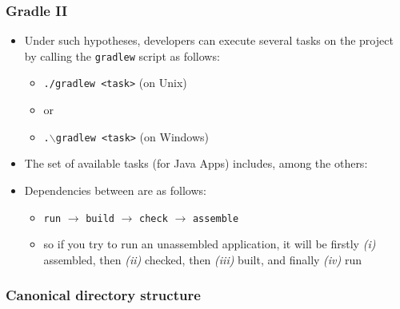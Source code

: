 \documentclass[handout]{beamer}\mode<presentation>{\usetheme{AMSCesenaBleu}}
\begin{document}
\begin{frame}
\frametitle{Gradle II}
    \begin{itemize}
        \item<1-8> Under such hypotheses, developers can execute several tasks on the project by calling the \texttt{gradlew} script as follows:
        \begin{itemize}
            \item<1-8>[\$] \texttt{\alert{./}gradlew \alert{<task>}} \quad (on Unix)
            \item<1-8>[] or
            \item<1-8>[$>$] \texttt{\alert{.$\backslash$}gradlew \alert{<task>}} \quad (on Windows)
        \end{itemize}
        
        \item<2-7> The set of available tasks (for Java Apps) includes, among the others:
        
        \item<8> Dependencies between are as follows: 
        \begin{itemize}
            \item<8> \texttt{run} $\rightarrow$ \texttt{build} $\rightarrow$ \texttt{check} $\rightarrow$ \texttt{assemble}
            \item<8> so if you try to run an unassembled application, it will be firstly \emph{(i)} assembled, then \emph{(ii)} checked, then \emph{(iii)} built, and finally \emph{(iv)} run
        \end{itemize}
    \end{itemize}

\end{frame}

\subsubsection{Canonical directory structure}
\end{document}
